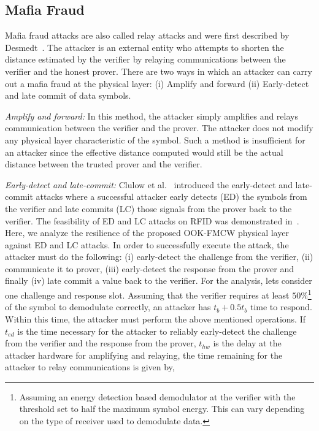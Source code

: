 \documentclass{sig-alternate-10pt}
\begin{document}
\subsection{Mafia Fraud}
\label{subsec:mafia-fraud}

Mafia fraud attacks are also called relay attacks and were first described by
Desmedt~\cite{DesmedtAug87}. The attacker is an external entity who attempts to
shorten the distance estimated by the verifier by relaying communications
between the verifier and the honest prover. There are two ways in which an
attacker can carry out a mafia fraud at the physical layer: (i) Amplify and
forward (ii) Early-detect and late commit of data symbols.

\emph{Amplify and forward:} In this method, the attacker simply amplifies and
relays communication between the verifier and the prover. The attacker does
not modify any physical layer characteristic of the symbol. Such a method is
insufficient for an attacker since the effective distance computed would still
be the actual distance between the trusted prover and the verifier.

\emph{Early-detect and late-commit:} Clulow et al.~\cite{ClulowSep06} introduced
the early-detect and late-commit attacks where a successful attacker early
detects (ED) the symbols from the verifier and late commits (LC) those signals
from the prover back to the verifier. The feasibility of ED and LC attacks on
RFID was demonstrated in~\cite{HanckeApr08}. Here, we analyze the resilience of
the proposed OOK-FMCW physical layer against ED and LC attacks. In order to
successfully execute the attack, the attacker must do the following: (i)
early-detect the challenge from the verifier, (ii) communicate it to prover,
(iii) early-detect the response from the prover and finally (iv) late commit a
value back to the verifier. For the analysis, lets consider one challenge and
response slot. Assuming that the verifier requires at least
$50\%$\footnote{Assuming an energy detection based demodulator at the verifier
  with the threshold set to half the maximum symbol energy. This can vary
  depending on the type of receiver used to demodulate data.} of the symbol to
demodulate correctly, an attacker has $t_b + 0.5t_b$ time to respond. Within
this time, the attacker must perform the above mentioned operations. If $t_{ed}$
is the time necessary for the attacker to reliably early-detect the challenge
from the verifier and the response from the prover, $t_{hw}$ is the delay at the
attacker hardware for amplifying and relaying, the time remaining for the
attacker to relay communications is given by,
\end{document}
